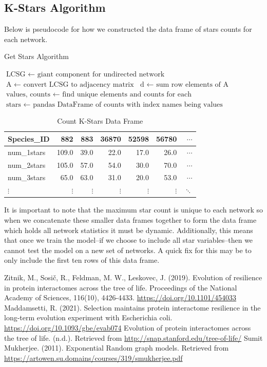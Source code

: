 \documentclass[12pt]{article}
\begin{document}
\subsection{K-Stars Algorithm}
Below is pseudocode for how we constructed the data frame of stars counts for each network.
\begin{algorithm}
\caption{Get Stars Algorithm}\label{alg:cap}
\begin{algorithmic}
\State $\text{LCSG } \gets \text{ giant component for undirected network}$
\State $\text{A } \gets \text{ convert LCSG to adjacency matrix}$
\State $\text{d } \gets \text{ sum row elements of A}$
\State $\text{values, counts } \gets \text{ find unique elements and counts for each}$
\State $\text{stars } \gets \text{ pandas DataFrame of counts with index names being values}$
\end{algorithmic}
\end{algorithm}
\begin{table}[H]
\centering
\caption{Count K-Stars Data Frame}
\begin{tabular}{lrrrrrr}
\toprule
Species\_ID &  882   &  883   &  36870 &  52598 &  56780 & $\cdots$\\
\midrule
num\_1stars &  109.0 &   39.0 &   22.0 &   17.0 &   26.0 & $\cdots$\\
num\_2stars &  105.0 &   57.0 &   54.0 &   30.0 &   70.0 & $\cdots$\\
num\_3stars &   65.0 &   63.0 &   31.0 &   20.0 &   53.0 & $\cdots$\\
$\vdots$ &   $\vdots$ &   $\vdots$ &   $\vdots$ &    $\vdots$ &   $\vdots$ & $\ddots$\\
\bottomrule
\end{tabular}
\end{table}
It is important to note that the maximum star count is unique to each network so when we concatenate these smaller data frames together to form the data frame which holds all network statistics it must be dynamic. Additionally, this means that once we train the model--if we choose to include all star variables--then we cannot test the model on a new set of networks. A quick fix for this may be to only include the first ten rows of this data frame. \newpage
\begin{thebibliography}{1}
  Zitnik, M., Sosič, R., Feldman, M. W., Leskovec, J. (2019). Evolution of resilience in protein interactomes across the tree of life. Proceedings of the National Academy of Sciences, 116(10), 4426-4433. \url{https://doi.org/10.1101/454033}
 Maddamsetti, R. (2021). Selection maintains protein interactome resilience in the long-term evolution experiment with Escherichia coli. \url{https://doi.org/10.1093/gbe/evab074}
 Evolution of protein interactomes across the tree of life. (n.d.). Retrieved from \url{http://snap.stanford.edu/tree-of-life/}
 Sumit Mukherjee. (2011). Exponential Random graph models. Retrieved from \url{https://artowen.su.domains/courses/319/smukherjee.pdf}
  \end{thebibliography}

\end{document}
